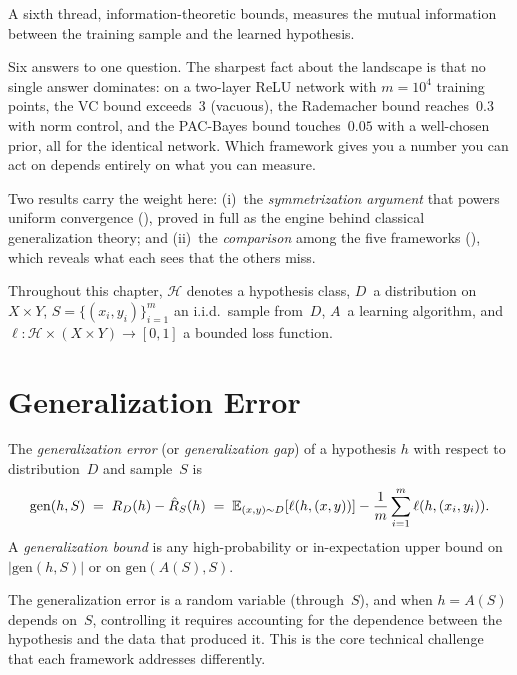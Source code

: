 \noindent
A sixth thread, information-theoretic bounds, measures the mutual
information between the training sample and the learned hypothesis.

Six answers to one question. The sharpest fact about the landscape is that no single answer dominates: on a two-layer ReLU network with $m = 10^4$ training points, the VC bound exceeds~$3$ (vacuous), the Rademacher bound reaches~$0.3$ with norm control, and the PAC-Bayes bound touches~$0.05$ with a well-chosen prior, all for the identical network. Which framework gives you a number you can act on depends entirely on what you can measure.

Two results carry the weight here: (i)~the \emph{symmetrization
argument} that powers uniform convergence (),
proved in full as the engine behind classical generalization theory; and
(ii)~the \emph{comparison} among the five frameworks
(), which reveals what each sees that the others miss.

\medskip

Throughout this chapter, $\mathcal{H}$ denotes a hypothesis class,
$D$~a distribution on $X \times Y$,
$S = \{(x_i, y_i)\}_{i=1}^m$ an i.i.d.\ sample from~$D$,
$A$~a learning algorithm, and
$\ell \colon \mathcal{H} \times (X \times Y) \to [0,1]$ a bounded loss
function.



\section{Generalization Error}
\label{sec:gen-error}

\begin{defn}
\label{def:gen-error}
The \emph{generalization error} (or \emph{generalization gap}) of a
hypothesis $h$ with respect to distribution~$D$ and sample~$S$ is
\[
  \mathrm{gen}(h, S) \;=\; R_D(h) - \hat{R}_S(h)
    \;=\; \mathbb{E}_{(x,y) \sim D}[\ell(h, (x,y))]
    - \frac{1}{m}\sum_{i=1}^m \ell(h, (x_i, y_i)).
\]
A \emph{generalization bound} is any high-probability or in-expectation
upper bound on $|\mathrm{gen}(h, S)|$ or on $\mathrm{gen}(A(S), S)$.
\end{defn}

The generalization error is a random variable (through~$S$), and when
$h = A(S)$ depends on~$S$, controlling it requires accounting for the
dependence between the hypothesis and the data that produced it.  This is
the core technical challenge that each framework addresses differently.


